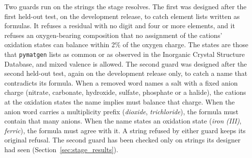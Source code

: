 \documentclass[10pt,journal]{IEEEtran}
\newcommand{\pmg}{\texttt{pymatgen}\xspace}
\begin{document}
Two guards run on the strings the stage resolves. The first was designed after the first held-out test, on the development release, to catch element lists written as formulas. It refuses a residual with no digit and four or more elements, and it refuses an oxygen-bearing composition that no assignment of the cations' oxidation states can balance within 2\% of the oxygen charge. The states are those that \pmg lists as common or as observed in the Inorganic Crystal Structure Database, and mixed valence is allowed. The second guard was designed after the second held-out test, again on the development release only, to catch a name that contradicts its formula. When a removed word names a salt with a fixed anion charge (nitrate, carbonate, hydroxide, sulfate, phosphate or a halide), the cations at the oxidation states the name implies must balance that charge. When the anion word carries a multiplicity prefix (\emph{dioxide}, \emph{trichloride}), the formula must contain that many anions. When the name states an oxidation state (\emph{iron (III)}, \emph{ferric}), the formula must agree with it. A string refused by either guard keeps its original refusal. The second guard has been checked only on strings its designer had seen (Section~\ref{sec:stage_results}).
\end{document}
